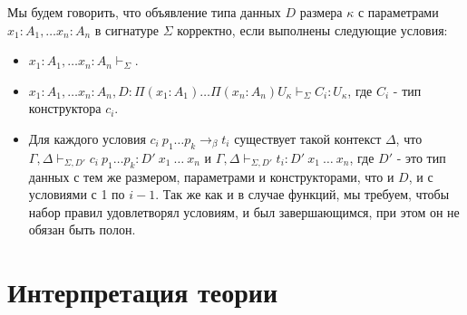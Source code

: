 \documentclass{amsart}
\theoremstyle{definition}
\theoremstyle{remark}
\numberwithin{figure}{section}
\begin{document}
Мы будем говорить, что объявление типа данных $D$ размера $\kappa$ с параметрами $x_1 : A_1, \ldots x_n : A_n$ в сигнатуре $\Sigma$ корректно, если выполнены следующие условия:
\begin{itemize}
\item $x_1 : A_1, \ldots x_n : A_n \vdash_\Sigma$.
\item $x_1 : A_1, \ldots x_n : A_n, D : \Pi (x_1 : A_1) \ldots \Pi (x_n : A_n) U_\kappa \vdash_\Sigma C_i : U_\kappa$, где $C_i$ - тип конструктора $c_i$.
\item Для каждого условия $c_i\ p_1 \ldots p_k \to_\beta t_i$ существует такой контекст $\Delta$,
    что $\Gamma, \Delta \vdash_{\Sigma,D'} c_i\ p_1 \ldots p_k : D'\ x_1\ \ldots\ x_n$ и $\Gamma, \Delta \vdash_{\Sigma,D'} t_i : D'\ x_1\ \ldots\ x_n$,
    где $D'$ - это тип данных с тем же размером, параметрами и конструкторами, что и $D$, и с условиями с 1 по $i - 1$.
    Так же как и в случае функций, мы требуем, чтобы набор правил удовлетворял условиям, и был завершающимся, при этом он не обязан быть полон.
\end{itemize}

\section{Интерпретация теории}
\end{document}
